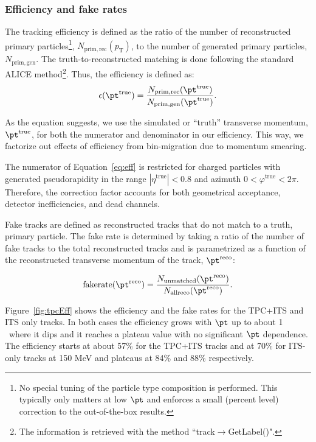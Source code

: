 \subsubsection{Efficiency and fake rates}
\label{sec:Efficiency_fake_rates}
The tracking efficiency is defined as the ratio of the number of reconstructed primary particles\footnote{No special tuning of the particle type composition is performed. This typically only matters at low $\pt$ and enforces a small (percent level) correction to the out-of-the-box results.}, $N_{\mathrm{prim,rec}}(p_\mathrm{T})$, to the number of generated primary particles, $N_{\mathrm{prim,gen}}$. The truth-to-reconstructed matching is done following the standard ALICE method\footnote{The information is retrieved with the method ``track$\to$GetLabel()".}. Thus, the efficiency is defined as: 
\begin{equation}\label{eq:eff}
\epsilon (\pt^{\mathrm{true}}) = \frac{N_{\mathrm{prim,rec}}(\pt^{\mathrm{true}})}{N_{\mathrm{prim,gen}}(\pt^{\mathrm{true}})}.
\end{equation}

As the equation suggests, we use the simulated or ``truth'' transverse momentum, $\pt^{\mathrm{true}}$, for both the numerator and denominator in our efficiency. This way, we factorize out effects of efficiency from bin-migration due to momentum smearing.

The numerator of Equation~\ref{eq:eff} is restricted for charged particles with generated pseudorapidity in the range $|\eta^{\mathrm{true}}|<0.8$ and azimuth $0<\varphi^{\mathrm{true}}<2\pi$. Therefore, the correction factor accounts for both geometrical acceptance, detector inefficiencies, and dead channels.  

Fake tracks are defined as reconstructed tracks that do not match to a truth, primary particle. The fake rate is determined by taking a ratio of the number of fake tracks to the total reconstructed tracks and is parametrized as a function of the reconstructed transverse momentum of the track, $\pt^{\mathrm{reco}}$:

\begin{equation}\label{eq:fakes}
\mathrm{fake rate} (\pt^{\mathrm{reco}}) = \frac{N_{\mathrm{unmatched}}(\pt^{\mathrm{reco}})}{N_{\mathrm{all reco}}(\pt^{\mathrm{reco}})}.
\end{equation}

Figure~\ref{fig:tpcEff} shows the efficiency and the fake rates for the TPC+ITS and ITS only tracks. In both cases the efficiency grows with $\pt$ up to about 1 \GeVc~where it dips and it reaches a plateau value with no significant $\pt$ dependence. The efficiency starts at about 57$\%$ for the TPC+ITS tracks and at 70$\%$ for ITS-only tracks at 150 MeV and plateaus at 84\% and 88\% respectively. %

